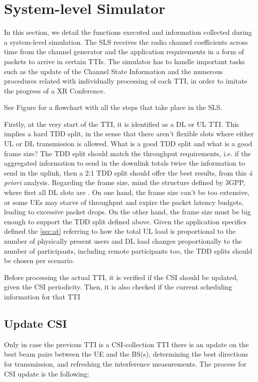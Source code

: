 \section{System-level Simulator}
\label{sec:sls}

In this section, we detail the functions executed and information collected during a system-level simulation. The \ac{SLS} receives the radio channel coefficients across time from the channel generator and the application requirements in a form of packets to arrive in certain \acp{TTI}. The simulator has to handle important tasks such as the update of the Channel State Information and the numerous procedures related with individually processing of each \ac{TTI}, in order to imitate the progress of a XR Conference. 

See Figure %
for a flowchart with all the steps that take place in the SLS.


Firstly, at the very start of the TTI, it is identified as a DL or UL TTI. This implies a hard TDD split, in the sense that there aren't flexible slots where either UL or DL transmission is allowed. What is a good TDD split and what is a good frame size? The TDD split should match the throughput requirements, i.e. if the aggregated information to send in the downlink totals twice the information to send in the uplink, then a 2:1 TDD split should offer the best results, from this \textit{à priori} analysis. Regarding the frame size, mind the structure defined by 3GPP, where first all DL slots are . On one hand, the frame size can't be too extensive, or some UEs may starve of throughput and expire the packet latency budgets, leading to excessive packet drops. On the other hand, the frame size must be big enough to support the TDD split defined above. Given the application specifics defined the \ref{sec:at} referring to how the total UL load is proportional to the number of physically present users and DL load changes proportionally to the number of participants, including remote participants too, the TDD splits should be chosen per scenario. 

Before processing the actual TTI, it is verified if the CSI should be updated, given the CSI periodicity. Then, it is also checked if the current scheduling information for that TTI

\subsection{Update CSI}
Only in case the previous \ac{TTI} is a \ac{CSI}-collection \ac{TTI} there is an update on the best beam pairs between the UE and the BS(s), determining the best directions for transmission, and refreshing the interference measurements. The process for CSI update is the following:

